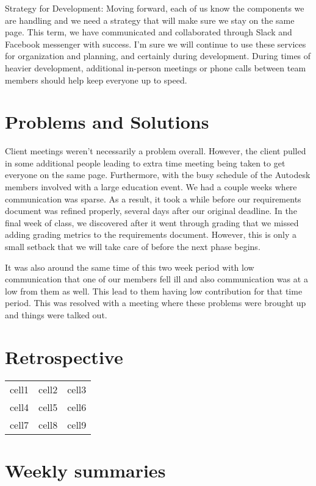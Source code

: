 \documentclass[10pt,draftclsnofoot,onecolumn]{IEEEtran}
\begin{document}
Strategy for Development:
Moving forward, each of us know the components we are handling and we need a strategy that will make sure we stay on the same page. This term, we have communicated and collaborated through Slack and Facebook messenger with success. I'm sure we will continue to use these services for organization and planning, and certainly during development. During times of heavier development, additional in-person meetings or phone calls between team members should help keep everyone up to speed.


\section{Problems and Solutions}
Client meetings weren’t necessarily a problem overall. However, the client pulled in some additional people leading to extra time meeting being taken to get everyone on the same page. Furthermore, with the busy schedule of the Autodesk members involved with a large education event. We had a couple weeks where communication was sparse. As a result, it took a while before our requirements document was refined properly, several days after our original deadline. In the final week of class, we discovered after it went through grading that we missed adding grading metrics to the requirements document. However, this is only a small setback that we will take care of before the next phase begins. 


It was also around the same time of this two week period with low communication that one of our members fell ill and also communication was at a low from them as well. This lead to them having low contribution for that time period. This was resolved with a meeting where these problems were brought up and things were talked out.

\section{Retrospective}

\begin{center}
\begin{tabular}{ |c|c|c| } 
 \hline
 cell1 & cell2 & cell3 \\ 
 cell4 & cell5 & cell6 \\ 
 cell7 & cell8 & cell9 \\ 
 \hline
\end{tabular}
\end{center}


\section{Weekly summaries}
\end{document}
